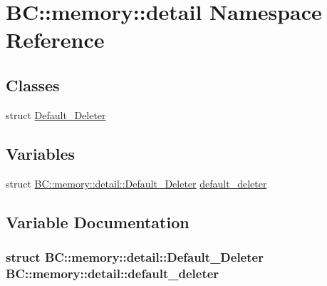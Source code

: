 \hypertarget{namespaceBC_1_1memory_1_1detail}{}\section{BC\+:\+:memory\+:\+:detail Namespace Reference}
\label{namespaceBC_1_1memory_1_1detail}
\subsection*{Classes}
\begin{DoxyCompactItemize}
\item 
struct \hyperlink{structBC_1_1memory_1_1detail_1_1Default__Deleter}{Default\+\_\+\+Deleter}
\end{DoxyCompactItemize}
\subsection*{Variables}
\begin{DoxyCompactItemize}
\item 
struct \hyperlink{structBC_1_1memory_1_1detail_1_1Default__Deleter}{B\+C\+::memory\+::detail\+::\+Default\+\_\+\+Deleter} \hyperlink{namespaceBC_1_1memory_1_1detail_a42827b91c57157365e4c7249397f12b6}{default\+\_\+deleter}
\end{DoxyCompactItemize}


\subsection{Variable Documentation}
\subsubsection[{\texorpdfstring{default\+\_\+deleter}{default_deleter}}]{\setlength{\rightskip}{0pt plus 5cm}struct {\bf B\+C\+::memory\+::detail\+::\+Default\+\_\+\+Deleter}  B\+C\+::memory\+::detail\+::default\+\_\+deleter}\hypertarget{namespaceBC_1_1memory_1_1detail_a42827b91c57157365e4c7249397f12b6}{}\label{namespaceBC_1_1memory_1_1detail_a42827b91c57157365e4c7249397f12b6}
